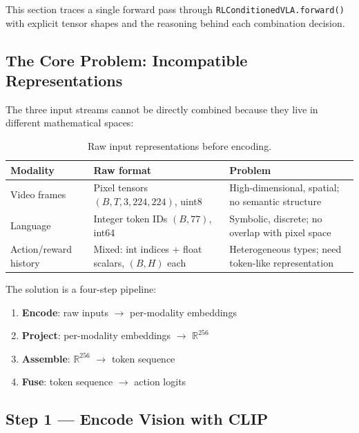 \documentclass[12pt, a4paper]{article}
\begin{document}
This section traces a single forward pass through \texttt{RLConditionedVLA.forward()}
with explicit tensor shapes and the reasoning behind each combination decision.

\subsection{The Core Problem: Incompatible Representations}

The three input streams cannot be directly combined because they live in
different mathematical spaces:

\begin{table}[h]
\centering
\caption{Raw input representations before encoding.}
\begin{tabular}{L{3.2cm} L{4.5cm} L{5cm}}
\toprule
\textbf{Modality} & \textbf{Raw format} & \textbf{Problem} \\
\midrule
Video frames      & Pixel tensors \newline$(B,T,3,224,224)$, uint8
                  & High-dimensional, spatial; no semantic structure \\
Language          & Integer token IDs \newline$(B,77)$, int64
                  & Symbolic, discrete; no overlap with pixel space \\
Action/reward history
                  & Mixed: int indices + float scalars, $(B,H)$ each
                  & Heterogeneous types; need token-like representation \\
\bottomrule
\end{tabular}
\end{table}

The solution is a four-step pipeline:
\begin{enumerate}[label=\textbf{\Roman*.}, leftmargin=2em]
  \item \textbf{Encode}: raw inputs $\rightarrow$ per-modality embeddings
  \item \textbf{Project}: per-modality embeddings $\rightarrow$ $\mathbb{R}^{256}$
  \item \textbf{Assemble}: $\mathbb{R}^{256}$ $\rightarrow$ token sequence
  \item \textbf{Fuse}: token sequence $\rightarrow$ action logits
\end{enumerate}

\subsection{Step 1 — Encode Vision with CLIP}
\label{sec:step1}
\end{document}
